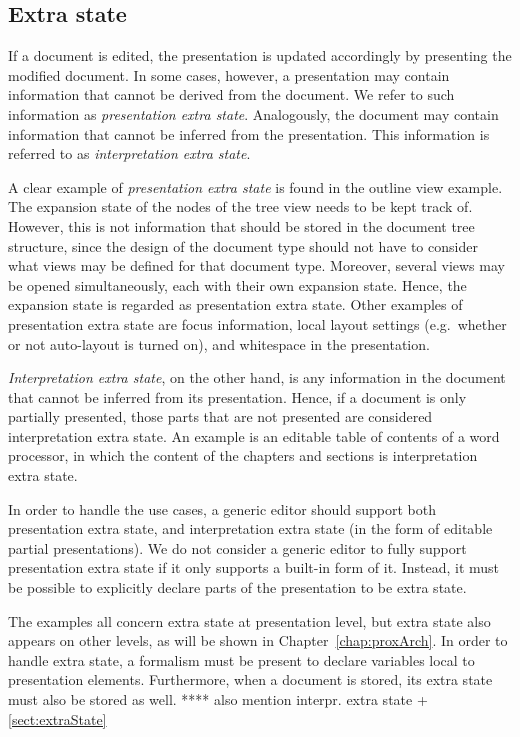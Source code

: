 \documentclass{speauth}
\begin{document}
%																
\subsection{Extra state} \label{sect:editingExtraState}

If a document is edited, the presentation is updated accordingly by presenting the modified document. In some cases, however, a presentation may contain information that cannot be derived from the document. We refer to such information as {\em presentation extra state}. Analogously, the document may contain information that cannot be inferred from the presentation. This information is referred to as {\em interpretation extra state}. 

A clear example of {\em presentation extra state} is found in the outline view example. The expansion state of the nodes of the tree view needs to be kept track of. However, this is not information that should be stored in the document tree structure, since the design of the document type should not have to consider what views may be defined for that document type. Moreover, several views may be opened simultaneously, each with their own expansion state. Hence, the expansion state is regarded as presentation extra state. Other examples of presentation extra state are focus information, local layout settings (e.g.\ whether or not auto-layout is turned on), and whitespace in the presentation. 

{\em Interpretation extra state}, on the other hand, is any information in the document that cannot be inferred from its presentation. Hence, if a document is only partially presented, those parts that are not presented are considered interpretation extra state. An example is an editable table of contents of a word processor, in which the content of the chapters and sections is interpretation extra state.

In order to handle the use cases, a generic editor should support both presentation extra state, and interpretation extra state (in the form of editable partial presentations). We do not consider a generic editor to fully support presentation extra state if it only supports a built-in form of it. Instead, it must be possible to explicitly declare parts of the presentation to be extra state.

\bc
The examples all concern extra state at presentation level, but extra state also appears on other levels, as will be shown in Chapter~\ref{chap:proxArch}. In order to handle extra state, a formalism must be present to declare variables local to presentation elements. Furthermore, when a document is stored, its extra state must also be stored as well. **** also mention interpr. extra state + \ref{sect:extraState}
\ec
\end{document}
